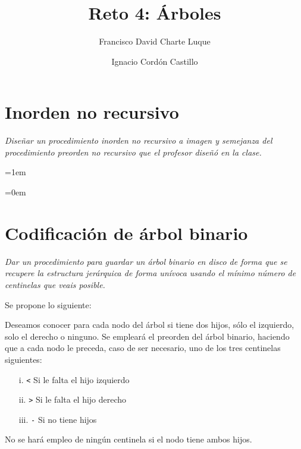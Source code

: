 \documentclass[a4paper,10pt]{scrartcl}
\title{Reto 4: Árboles}
\author{Francisco David Charte Luque\and
        Ignacio Cordón Castillo}
\date{}
\begin{document}
\maketitle
\section{Inorden no recursivo}
 \textit{Diseñar un procedimiento inorden no recursivo a imagen y semejanza del 
 procedimiento preorden no recursivo que el profesor diseñó en la clase.}
 \
 
 \leftskip=1em
 \texttt{}
  
\leftskip=0em
\section{Codificación de árbol binario} 

\textit{Dar un procedimiento para guardar un árbol binario en disco de forma
 que se recupere la estructura jerárquica de forma unívoca usando el mínimo
 número de centinelas que veais posible.}
 
 Se propone lo siguiente:
 
 Deseamos conocer para cada nodo del árbol si tiene dos hijos, sólo el
 izquierdo, solo el derecho o ninguno. Se empleará el preorden del árbol
 binario, haciendo que a cada nodo le preceda, caso de ser necesario, uno
 de los tres centinelas siguientes:
  
 \begin{enumerate}
 \item[i.] \texttt{<} Si le falta el hijo izquierdo
 \item[ii.] \texttt{>} Si le falta el hijo derecho
 \item[iii.] \texttt{-} Si no tiene hijos
 \end{enumerate}
 
 No se hará empleo de ningún centinela si el nodo tiene ambos hijos.
\end{document}
